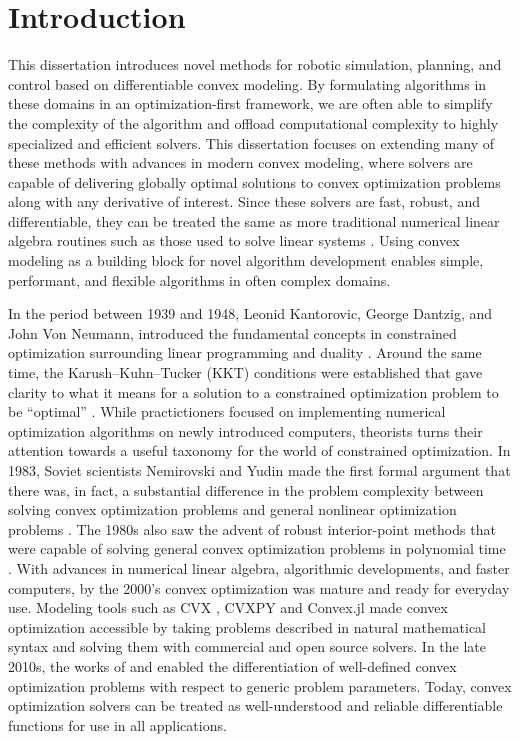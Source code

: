 \chapter{Introduction}

This dissertation introduces novel methods for robotic simulation, planning, and control based on differentiable convex modeling.
By formulating algorithms in these domains in an optimization-first framework, we are often able to simplify the complexity of the algorithm and offload computational complexity to highly specialized and efficient solvers.
This dissertation focuses on extending many of these methods with advances in modern convex modeling, where solvers are capable of delivering globally optimal solutions to convex optimization problems along with any derivative of interest.
Since these solvers are fast, robust, and differentiable, they can be treated the same as more traditional numerical linear algebra routines such as those used to solve linear systems \cite{boyd2004}.
Using convex modeling as a building block for novel algorithm development enables simple, performant, and flexible algorithms in often complex domains. 

In the period between 1939 and 1948, Leonid Kantorovic, George Dantzig, and John Von Neumann, introduced the fundamental concepts in constrained optimization surrounding linear programming and duality \cite{dantzig1990}.
Around the same time, the Karush–Kuhn–Tucker (KKT) conditions were established that gave clarity to what it means for a solution to a constrained optimization problem to be ``optimal'' \cite{boyd2004}.
While practictioners focused on implementing numerical optimization algorithms on newly introduced computers, theorists turns their attention towards a useful taxonomy for the world of constrained optimization.
In 1983, Soviet scientists Nemirovski and Yudin made the first formal argument that there was, in fact, a substantial difference in the problem complexity between solving convex optimization problems and general nonlinear optimization problems \cite{blair1985}.
The 1980s also saw the advent of robust interior-point methods that were capable of solving general convex optimization problems in polynomial time \cite{mehrotra1992}. 
With advances in numerical linear algebra, algorithmic developments, and faster computers, by the 2000's convex optimization was mature and ready for everyday use.
Modeling tools such as CVX \cite{grant}, CVXPY \cite{diamond} and Convex.jl \cite{udell2014} made convex optimization accessible by taking problems described in natural mathematical syntax and solving them with commercial and open source solvers. 
In the late 2010s, the works of \cite{amos2017} and \cite{agrawal2019} enabled the differentiation of well-defined convex optimization problems with respect to generic problem parameters.
Today, convex optimization solvers can be treated as well-understood and reliable differentiable functions for use in all applications. 

